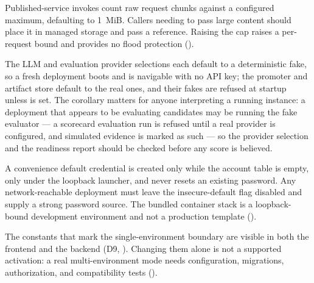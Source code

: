  Published-service invokes count raw
request chunks against a configured maximum, defaulting to 1~MiB. Callers needing to
pass large content should place it in managed storage and pass a reference. Raising
the cap raises a per-request bound and provides no flood protection
().

 The LLM
and evaluation provider selections each default to a deterministic fake, so a fresh
deployment boots and is navigable with no API key; the promoter and artifact store
default to the real \mlflow{} ones, and their fakes are refused at startup unless
 is set. The corollary matters for anyone
interpreting a running instance: a deployment that appears to be evaluating
candidates may be running the fake evaluator --- a scorecard evaluation run is
refused until a real provider is configured, and simulated evidence is marked as
such --- so the provider
selection and the readiness report should be checked before any score is believed.

 A convenience default credential is
created only while the account table is empty, only under the loopback launcher, and
never resets an existing password. Any network-reachable deployment must leave the
insecure-default flag disabled and supply a strong password source. The bundled
container stack is a loopback-bound development environment and not a production
template ().

 The constants that mark
the single-environment boundary are visible in both the frontend and the backend
(D9, ). Changing them alone is not a supported activation: a
real multi-environment mode needs configuration, migrations, authorization, and
compatibility tests ().
